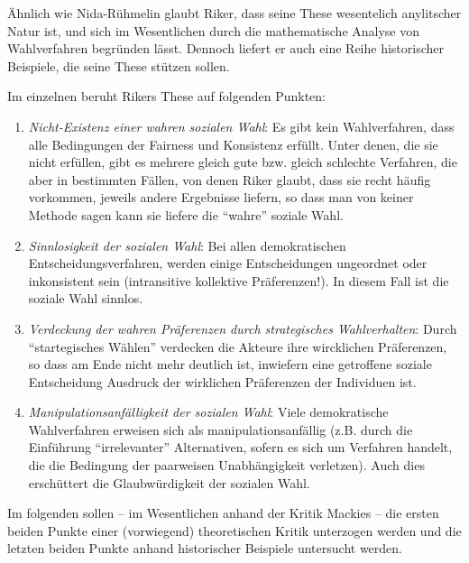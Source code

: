 Ähnlich wie Nida-Rühmelin glaubt Riker, dass seine These wesentelich
anylitscher Natur ist, und sich im Wesentlichen durch die mathematische Analyse
von Wahlverfahren begründen lässt. Dennoch liefert er auch eine Reihe
historischer Beispiele, die seine These stützen sollen. 

Im einzelnen beruht Rikers These auf folgenden Punkten:

\begin{enumerate}
  \item {\em Nicht-Existenz einer wahren sozialen Wahl}: Es gibt kein
  Wahlverfahren, dass alle Bedingungen der Fairness und Konsistenz erfüllt. 
  Unter denen, die sie nicht erfüllen, gibt es mehrere
  gleich gute bzw. gleich schlechte Verfahren, die aber in bestimmten
  Fällen, von denen Riker glaubt, dass sie recht häufig vorkommen, jeweils
  andere Ergebnisse liefern, so dass man von keiner Methode sagen 
  kann sie liefere die "`wahre"'
  soziale Wahl. \cite[S. 111ff.]{riker:1982}

  \item {\em Sinnlosigkeit der sozialen Wahl}: Bei allen demokratischen
  Entscheidungsverfahren, werden einige Entscheidungen ungeordnet oder
  inkonsistent sein (intransitive kollektive Präferenzen!). In diesem Fall ist
  die soziale Wahl sinnlos. \cite[S. 136ff.]{riker:1982}

  \item {\em Verdeckung der wahren Präferenzen durch strategisches
  Wahlverhalten}: Durch "`startegisches Wählen"' verdecken die Akteure ihre
  wircklichen Präferenzen, so dass am Ende nicht mehr deutlich ist, inwiefern
  eine getroffene soziale Entscheidung Ausdruck der wirklichen Präferenzen der
  Individuen ist. \cite[S. 167ff.]{riker:1982}
  
  \item {\em Manipulationsanfälligkeit der sozialen Wahl}: Viele demokratische
  Wahlverfahren erweisen sich als manipulationsanfällig (z.B. durch die
  Einführung "`irrelevanter"' Alternativen, sofern es sich um Verfahren
  handelt, die die Bedingung der paarweisen Unabhängigkeit verletzen). Auch dies
  erschüttert die Glaubwürdigkeit der sozialen Wahl. \cite[S.
  192ff.]{riker:1982}
\end{enumerate}

Im folgenden sollen -- im Wesentlichen anhand der Kritik Mackies
\cite[]{mackie:2003} -- die ersten beiden Punkte einer (vorwiegend)
theoretischen Kritik unterzogen werden und die letzten beiden Punkte 
anhand historischer Beispiele untersucht werden.

